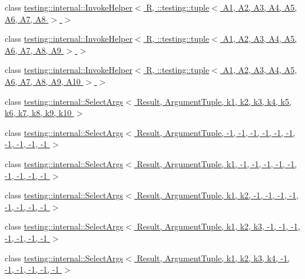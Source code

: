 \begin{DoxyCompactItemize}
class \hyperlink{classtesting_1_1internal_1_1_invoke_helper_3_01_r_00_01_1_1testing_1_1tuple_3_01_a1_00_01_a2_00_c90976166c933075c49792215d8203bb}{testing\+::internal\+::\+Invoke\+Helper$<$ R, \+::testing\+::tuple$<$ A1, A2, A3, A4, A5, A6, A7, A8 $>$ $>$}
\item 
class \hyperlink{classtesting_1_1internal_1_1_invoke_helper_3_01_r_00_01_1_1testing_1_1tuple_3_01_a1_00_01_a2_00_cb3e0694d0722fcc616ae618dc383e5b}{testing\+::internal\+::\+Invoke\+Helper$<$ R, \+::testing\+::tuple$<$ A1, A2, A3, A4, A5, A6, A7, A8, A9 $>$ $>$}
\item 
class \hyperlink{classtesting_1_1internal_1_1_invoke_helper_3_01_r_00_01_1_1testing_1_1tuple_3_01_a1_00_01_a2_00_d7025e877e4f690a17d0a7f1e26fac53}{testing\+::internal\+::\+Invoke\+Helper$<$ R, \+::testing\+::tuple$<$ A1, A2, A3, A4, A5, A6, A7, A8, A9, A10 $>$ $>$}
\item 
class \hyperlink{classtesting_1_1internal_1_1_select_args}{testing\+::internal\+::\+Select\+Args$<$ Result, Argument\+Tuple, k1, k2, k3, k4, k5, k6, k7, k8, k9, k10 $>$}
\item 
class \hyperlink{classtesting_1_1internal_1_1_select_args_3_01_result_00_01_argument_tuple_00_01-1_00_01-1_00_01-99299a766a33bd3110e39f51f43b194a}{testing\+::internal\+::\+Select\+Args$<$ Result, Argument\+Tuple, -\/1, -\/1, -\/1, -\/1, -\/1, -\/1, -\/1, -\/1, -\/1, -\/1 $>$}
\item 
class \hyperlink{classtesting_1_1internal_1_1_select_args_3_01_result_00_01_argument_tuple_00_01k1_00_01-1_00_01-33116bd77067572e384b90e7c70b03c4}{testing\+::internal\+::\+Select\+Args$<$ Result, Argument\+Tuple, k1, -\/1, -\/1, -\/1, -\/1, -\/1, -\/1, -\/1, -\/1, -\/1 $>$}
\item 
class \hyperlink{classtesting_1_1internal_1_1_select_args_3_01_result_00_01_argument_tuple_00_01k1_00_01k2_00_01-03e4fb75e6504ae34fdb48d64bb6de95}{testing\+::internal\+::\+Select\+Args$<$ Result, Argument\+Tuple, k1, k2, -\/1, -\/1, -\/1, -\/1, -\/1, -\/1, -\/1, -\/1 $>$}
\item 
class \hyperlink{classtesting_1_1internal_1_1_select_args_3_01_result_00_01_argument_tuple_00_01k1_00_01k2_00_01k43121451b69bc30ee1dad887e67d8807}{testing\+::internal\+::\+Select\+Args$<$ Result, Argument\+Tuple, k1, k2, k3, -\/1, -\/1, -\/1, -\/1, -\/1, -\/1, -\/1 $>$}
\item 
class \hyperlink{classtesting_1_1internal_1_1_select_args_3_01_result_00_01_argument_tuple_00_01k1_00_01k2_00_01k7cadbb88f40ff7408f8c070bb61c70db}{testing\+::internal\+::\+Select\+Args$<$ Result, Argument\+Tuple, k1, k2, k3, k4, -\/1, -\/1, -\/1, -\/1, -\/1, -\/1 $>$}

\end{DoxyCompactItemize}
